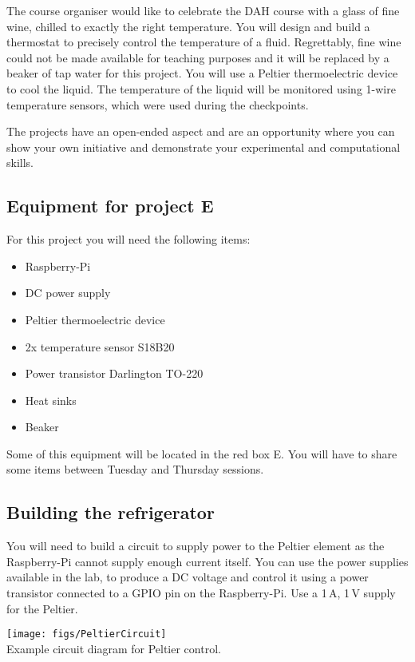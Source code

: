 The course organiser would like to celebrate the DAH course with a glass of fine wine, chilled to exactly the right temperature.
You will design and build a thermostat to precisely control the temperature of a fluid.
Regrettably, fine wine could not be made available for teaching purposes and it will be replaced by a beaker of tap water for this project.
You will use a Peltier thermoelectric device to cool the liquid.
The temperature of the liquid will be monitored using 1-wire temperature sensors, which were used during the checkpoints.

The projects have an open-ended aspect and are an opportunity where you can show your own initiative and demonstrate your experimental and computational skills. 

\subsection{Equipment for project E}

For this project you will need the following items:
\begin{itemize}
\item Raspberry-Pi
\item DC power supply
\item Peltier thermoelectric device
\item 2x temperature sensor S18B20
\item Power transistor Darlington TO-220
\item Heat sinks
\item Beaker
\end{itemize}
Some of this equipment will be located in the red box E. You will have to share some items between Tuesday and Thursday sessions. 


\subsection{Building the refrigerator}

You will need to build a circuit to supply power to the Peltier element as the Raspberry-Pi cannot supply enough current itself.
You can use the power supplies available in the lab, to produce a DC voltage and control it using a power transistor connected to a GPIO pin on the Raspberry-Pi.
Use a 1\,A, 1\,V supply for the Peltier.

\begin{center}
	\texttt{[image: figs/PeltierCircuit]}\\
	{Example circuit diagram for Peltier control.}
\end{center}

